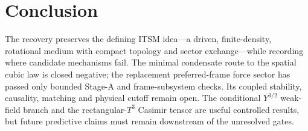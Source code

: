 \documentclass[11pt]{article}
\newcommand{\Tthree}{T^3}
\begin{document}
\tableofcontents












\section*{Conclusion}

The recovery preserves the defining ITSM idea---a driven, finite-density,
rotational medium with compact topology and sector exchange---while recording
where candidate mechanisms fail.  The minimal condensate route to the spatial
cubic law is closed negative; the replacement preferred-frame force sector has
passed only bounded Stage-A and frame-subsystem checks.  Its coupled stability,
causality, matching and physical cutoff remain open.  The conditional
$Y^{3/2}$ weak-field branch and the rectangular-$\Tthree$ Casimir tensor are
useful controlled results, but future predictive claims must remain downstream
of the unresolved gates.


\end{document}
